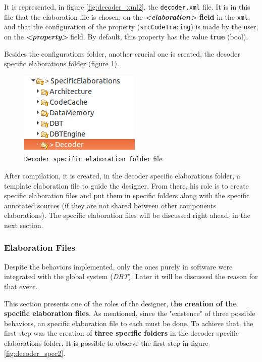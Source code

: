 It is represented, in figure \ref{fig:decoder_xml2}, the \texttt{decoder.xml} file. It is in this file that the elaboration file is chosen, on the \textbf{\textit{<elaboration>} field} in the \texttt{xml}, and that the configuration of the property (\texttt{srcCodeTracing}) is made by the user, on the\textit{\textbf{ <property>}} field. By default, this property has the value \textbf{true} (bool).

Besides the configurations folder, another crucial one is created, the decoder specific elaborations folder (figure \ref{fig:decoder_spec}).

\begin{figure}[H]
\centerline{
\includegraphics[scale=0.5]{images/decoder3}
}
\caption{\texttt{Decoder specific elaboration folder} file.}
\label{fig:decoder_spec}
\end{figure}

After compilation, it is created, in the decoder specific elaborations folder, a template elaboration file to guide the designer. From there, his role is to create specific elaboration files and put them in specific folders along with the specific annotated sources (if they are not shared between other components elaborations). The specific elaboration files will be discussed right ahead, in the next section.

\subsubsection{Elaboration Files}

Despite the behaviors implemented, only the ones purely in software were integrated with the global system (\textit{DBT}). Later it will be discussed the reason for that event. 

This section presents one of the roles of the designer, \textbf{the creation of the specific elaboration files}. As mentioned, since the "existence" of three possible behaviors, an specific elaboration file to each must be done. To achieve that, the first step was the creation of \textbf{three specific folders} in the decoder specific elaborations folder. It is possible to observe the first step in figure \ref{fig:decoder_spec2}.

